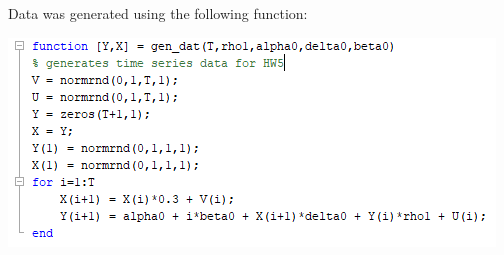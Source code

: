 \documentclass[11pt]{article} %
\begin{document}
Data was generated using the following function:

\includegraphics{hw5p4}
\end{document}
